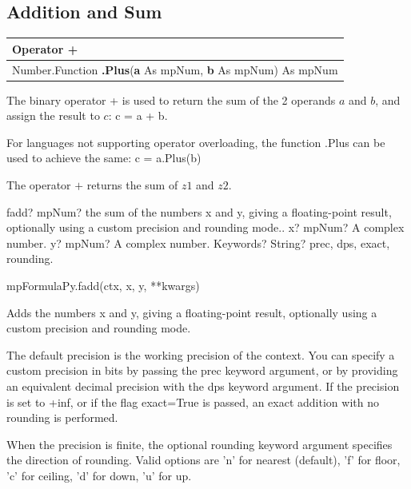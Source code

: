 \subsection{Addition and Sum}
\begin{tabular}{p{481pt}}
	\toprule
	\textsf{Operator \textbf{+}}\index{Multiprecision Functions!+} \\
	\midrule
	\textsf{Number.Function \textbf{.Plus}(\textbf{a} As mpNum, \textbf{b} As mpNum) As mpNum}\index{Multiprecision Functions!.Plus} \\
	\bottomrule
\end{tabular}

\vspace{0.3cm}
The binary operator + is used to return the sum of the 2 operands $a$ and $b$, and assign the result to $c$: \textsf{c = a + b}.

For languages not supporting operator overloading, the function \textsf{.Plus} can be used to achieve the same: \textsf{c = a.Plus(b)}


\vspace{0.3cm}
The operator $+$ returns the sum of $z1$ and $z2$.


\vspace{0.3cm}
\begin{mpFunctionsExtract}
	\mpFunctionThree
	{fadd? mpNum? the sum of the numbers x and y, giving a floating-point result, optionally using a custom precision and rounding mode..}
	{x? mpNum? A complex number.}
	{y? mpNum? A complex number.}
	{Keywords? String? prec, dps, exact, rounding.}	
\end{mpFunctionsExtract}

\vspace{0.3cm}

mpFormulaPy.fadd(ctx, x, y, **kwargs)

\vpara
Adds the numbers x and y, giving a floating-point result, optionally using a custom precision and rounding mode.

\vpara
The default precision is the working precision of the context. You can specify a custom precision in bits by passing the prec keyword argument, or by providing an equivalent decimal precision with the dps keyword argument. If the precision is set to +inf, or if the
flag exact=True is passed, an exact addition with no rounding is performed.

\vpara
When the precision is finite, the optional rounding keyword argument specifies the direction of rounding. Valid options are 'n' for nearest (default), 'f' for floor, 'c' for ceiling, 'd' for down, 'u' for up.

